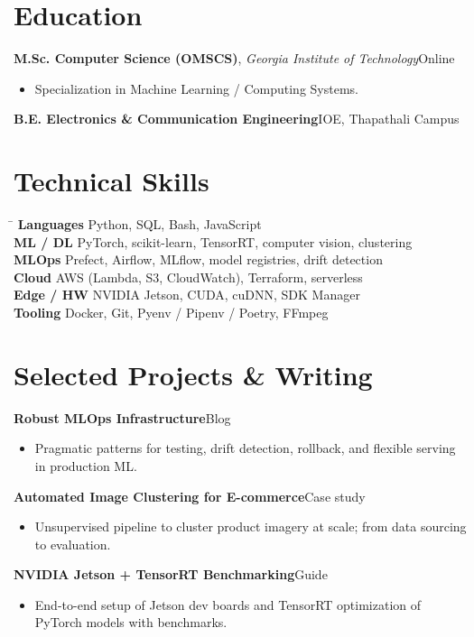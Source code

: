 \documentclass[a4paper,10pt]{article}
\newcommand{\entry}[2]{%
  \noindent\textbf{#1}\hfill{\small #2}\par
}
\newcommand{\role}[3]{%
  \noindent\textbf{#1}, \textit{#2}\hfill{\small #3}\par
}
\begin{document}
\section{Education}
\role{M.Sc. Computer Science (OMSCS)}{Georgia Institute of Technology}{Online}
\begin{itemize}
  \item Specialization in Machine Learning / Computing Systems.
\end{itemize}
\vspace{4pt}
\entry{B.E. Electronics \& Communication Engineering}{IOE, Thapathali Campus}

\newpage

\section{Technical Skills}
\begin{tabbing}
\hspace{2.4cm}\=\kill
\textbf{Languages} \> Python, SQL, Bash, JavaScript \\
\textbf{ML / DL} \> PyTorch, scikit-learn, TensorRT, computer vision, clustering \\
\textbf{MLOps} \> Prefect, Airflow, MLflow, model registries, drift detection \\
\textbf{Cloud} \> AWS (Lambda, S3, CloudWatch), Terraform, serverless \\
\textbf{Edge / HW} \> NVIDIA Jetson, CUDA, cuDNN, SDK Manager \\
\textbf{Tooling} \> Docker, Git, Pyenv / Pipenv / Poetry, FFmpeg \\
\end{tabbing}

\section{Selected Projects \& Writing}
\entry{Robust MLOps Infrastructure}{Blog}
\begin{itemize}
  \item Pragmatic patterns for testing, drift detection, rollback, and flexible serving in production ML.
\end{itemize}
\vspace{3pt}
\entry{Automated Image Clustering for E-commerce}{Case study}
\begin{itemize}
  \item Unsupervised pipeline to cluster product imagery at scale; from data sourcing to evaluation.
\end{itemize}
\vspace{3pt}
\entry{NVIDIA Jetson + TensorRT Benchmarking}{Guide}
\begin{itemize}
  \item End-to-end setup of Jetson dev boards and TensorRT optimization of PyTorch models with benchmarks.
\end{itemize}
\end{document}

